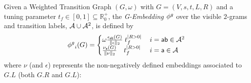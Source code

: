 \begin{definition}[G-Embedding]\label{def:ppne}
Given a Weighted Transition Graph $(G,\omega)$ with $G=(V,s,t,L,R)$ and a tuning parameter $t_f\in[0,1]\subseteq\mathbb{R}^+_{0}$, the \emph{G-Embedding} ${\phi^{g}}$ over the visible $2$-grams and transition labels, $\mathcal{A}\cup\mathcal{A}^2$, is defined by
$${\phi^{g}}_{i}(G)=\begin{cases}
	\omega \frac{\epsilon_{\mathsf{ab}}(G)}{\|\epsilon\|_2}\;t_f^{|R>0|}\, & {i}=\mathsf{ab}\in\mathcal{A}^2\\
	\frac{\nu_{\mathsf{a}}(G)}{\|\nu\|_2}\;\;\;\,t_f^{|R>0|}\, & {i}=\mathsf{a}\in\mathcal{A}\\
\end{cases}$$
where $\nu$ (and $\epsilon$) represents the non-negatively defined embeddings associated to $G.L$ (both $G.R$ and $G.L$): 
\end{definition}
